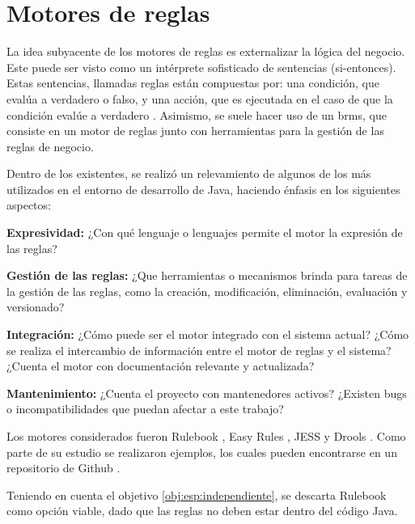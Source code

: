\section{Motores de reglas}\label{sec:motores}

La idea subyacente de los motores de reglas es externalizar la lógica del negocio. 
Este puede ser visto como un intérprete sofisticado de sentencias  (si-entonces). Estas sentencias, llamadas reglas están compuestas por: una condición, que evalúa a verdadero o falso, y una acción, que es ejecutada en el caso de que la condición evalúe a verdadero \cite{qusay2005jsr94}.
Asimismo, se suele hacer uso de un \acrfull{brms}, que consiste en un motor de reglas junto con herramientas para la gestión de las reglas de negocio.


Dentro de los existentes, se realizó un relevamiento de algunos de los más utilizados en el entorno de desarrollo de Java, haciendo énfasis en los siguientes aspectos:
\begin{enumerate*}[label=(\alph*)]
    \item 
    \label{comp:expresividad}
    \textbf{Expresividad:}
    ¿Con qué lenguaje o lenguajes permite el motor la expresión de las reglas?
    \item 
    \label{comp:gestion}
    \textbf{Gestión de las reglas:}
    ¿Que herramientas o mecanismos brinda para tareas de la gestión de las reglas, como la creación, modificación, eliminación, evaluación y versionado?
    \item 
    \label{comp:integracion}
    \textbf{Integración:}
    ¿Cómo puede ser el motor integrado con el sistema actual? ¿Cómo se realiza el intercambio de información entre el motor de reglas y el sistema? ¿Cuenta el motor con documentación relevante y actualizada?
    \item 
    \label{comp:mantenimiento}
    \textbf{Mantenimiento:}
    ¿Cuenta el proyecto con mantenedores activos? ¿Existen bugs o incompatibilidades que puedan afectar a este trabajo?
\end{enumerate*}

Los motores considerados fueron Rulebook \cite{rulebook}, Easy Rules \cite{easy-rules}, JESS \cite{jess} y Drools \cite{drools}.
Como parte de su estudio se realizaron ejemplos, los cuales pueden encontrarse en un repositorio de Github \cite{ejemplos}.

Teniendo en cuenta el objetivo \ref{obj:esp:independiente}, se descarta Rulebook como opción viable, dado que las reglas no deben estar dentro del código Java.

